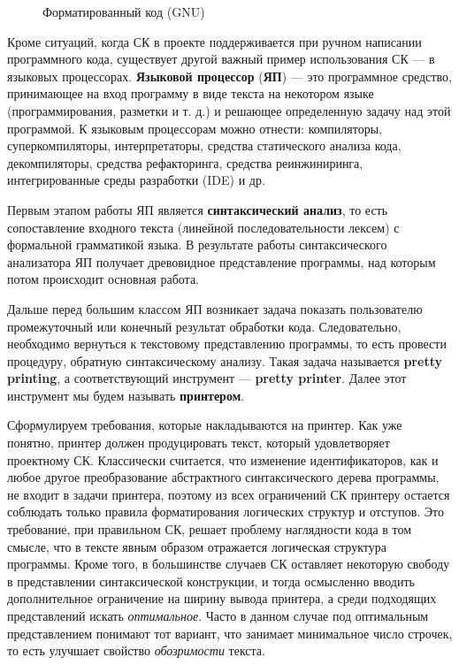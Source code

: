 \begin{figure}[h!]
	\centering
	
  \caption{Форматированный код (GNU)}
	\label{fig:wikiExGNU}
\end{figure}

Кроме ситуаций, когда СК в проекте поддерживается при ручном написании
программного кода, существует другой важный пример использования СК ---
в языковых процессорах. \textbf{Языковой процессор} (\textbf{ЯП}) ---
это программное средство, принимающее на вход программу в виде текста
на некотором языке (программирования, разметки и т. д.) и решающее
определенную задачу над этой программой. К языковым процессорам можно
отнести: компиляторы, суперкомпиляторы, интерпретаторы,
средства статического анализа кода, декомпиляторы, средства рефакторинга,
средства реинжиниринга, интегрированные среды разработки (IDE) и др.

Первым этапом работы ЯП является \textbf{синтаксический анализ}, то есть
сопоставление входного текста (линейной последовательности лексем) с формальной
грамматикой языка. В результате работы синтаксического анализатора ЯП получает
древовидное представление программы, над которым потом происходит основная работа.

Дальше перед большим классом ЯП возникает задача показать пользователю
промежуточный или конечный результат обработки кода.
Следовательно, необходимо вернуться к текстовому представлению программы,
то есть провести процедуру, обратную синтаксическому анализу. Такая задача
называется \textbf{pretty printing}, а соответствующий инструмент ---
\textbf{pretty printer}. Далее этот инструмент мы будем называть
\textbf{принтером}.

Сформулируем требования, которые накладываются на принтер.
Как уже понятно, принтер должен
продуцировать текст, который удовлетворяет проектному СК.
Классически считается, что изменение идентификаторов, как и любое другое
преобразование абстрактного синтаксического дерева программы, не входит в
задачи принтера, поэтому из всех ограничений СК принтеру остается 
соблюдать только правила форматирования логических структур и отступов.
Это требование, при правильном СК, решает проблему наглядности кода в том смысле,
что в тексте явным образом отражается логическая структура программы.
Кроме того, в большинстве случаев СК оставляет некоторую свободу в представлении
синтаксической конструкции, и тогда осмысленно вводить дополнительное
ограничение на ширину вывода принтера, а среди подходящих представлений
искать \textit{оптимальное}. Часто в данном случае под
оптимальным представлением понимают тот вариант,
что занимает минимальное число строчек,
то есть улучшает свойство \textit{обозримости} текста.

